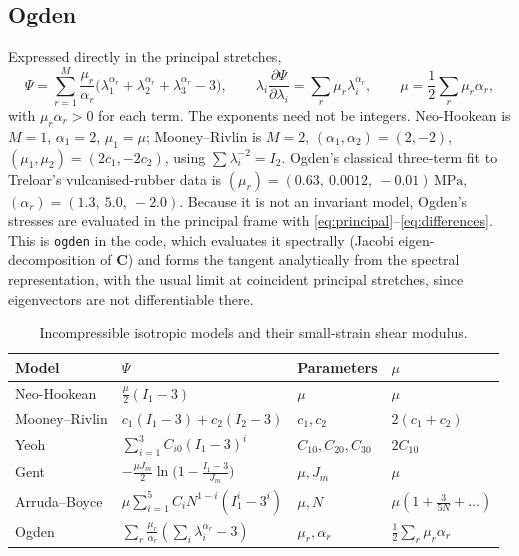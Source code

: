 \documentclass[11pt]{article}
\newcommand{\bC}{\bm{C}}
\newcommand{\Ione}{I_1}
\newcommand{\Itwo}{I_2}
\newcommand{\code}[1]{{\frenchspacing\texttt{#1}}}
\begin{document}
\subsection{Ogden}
Expressed directly in the principal stretches,
\begin{equation}
  \Psi = \sum_{r=1}^{M}\frac{\mu_r}{\alpha_r}
         \bigl(\lambda_1^{\alpha_r} + \lambda_2^{\alpha_r} + \lambda_3^{\alpha_r} - 3\bigr),
  \qquad
  \lambda_i\frac{\partial\Psi}{\partial\lambda_i} = \sum_{r}\mu_r\lambda_i^{\alpha_r},
  \qquad
  \mu = \frac12\sum_r\mu_r\alpha_r ,
\end{equation}
with $\mu_r\alpha_r > 0$ for each term.  The exponents need not be
integers.  Neo-Hookean is $M = 1$, $\alpha_1 = 2$, $\mu_1 = \mu$;
Mooney--Rivlin is $M = 2$, $(\alpha_1,\alpha_2) = (2,-2)$,
$(\mu_1,\mu_2) = (2c_1, -2c_2)$, using $\sum\lambda_i^{-2} = \Itwo$.  Ogden's
classical three-term fit to Treloar's vulcanised-rubber data is
$(\mu_r) = (0.63,\ 0.0012,\ -0.01)\,\mathrm{MPa}$,
$(\alpha_r) = (1.3,\ 5.0,\ -2.0)$.  Because it is not an invariant model,
Ogden's stresses are evaluated in the principal frame with
\eqref{eq:principal}--\eqref{eq:differences}.  This is \code{ogden} in the
code, which evaluates it spectrally (Jacobi eigen-decomposition of $\bC$)
and forms the tangent analytically from the spectral representation, with
the usual limit at coincident principal stretches, since eigenvectors are
not differentiable there.

\begin{table}[htbp]
\centering
\small
\begin{tabular}{@{}l l l l@{}}
\toprule
Model & $\Psi$ & Parameters & $\mu$ \\
\midrule
Neo-Hookean & $\frac{\mu}{2}(\Ione-3)$ & $\mu$ & $\mu$ \\
Mooney--Rivlin & $c_1(\Ione-3)+c_2(\Itwo-3)$ & $c_1, c_2$ & $2(c_1+c_2)$ \\
Yeoh & $\sum_{i=1}^{3}C_{i0}(\Ione-3)^i$ & $C_{10},C_{20},C_{30}$ & $2C_{10}$ \\
Gent & $-\frac{\mu J_m}{2}\ln\bigl(1-\frac{\Ione-3}{J_m}\bigr)$ & $\mu, J_m$ & $\mu$ \\
Arruda--Boyce & $\mu\sum_{i=1}^{5}C_iN^{1-i}(\Ione^i-3^i)$ & $\mu, N$ & $\mu(1+\frac{3}{5N}+\dots)$ \\
Ogden & $\sum_r\frac{\mu_r}{\alpha_r}(\sum_i\lambda_i^{\alpha_r}-3)$ & $\mu_r,\alpha_r$ & $\frac12\sum_r\mu_r\alpha_r$ \\
\bottomrule
\end{tabular}
\caption{Incompressible isotropic models and their small-strain shear modulus.}
\label{tab:models}
\end{table}
\end{document}
